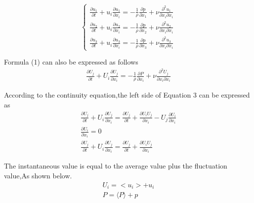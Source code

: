 \begin{equation}
\left\{
\begin{aligned}
\frac{\partial u_{1}}{\partial t}+u_{i}\frac{\partial u_{1}}{\partial x_{i}}=-\frac{1}{\rho}\frac{\partial p}{\partial x_{1}}+\nu\frac{\partial^2 u_{1}}{\partial x_{i} \partial x_{i}}\\
\frac{\partial u_{2}}{\partial t}+u_{i}\frac{\partial u_{2}}{\partial x_{i}}=-\frac{1}{\rho}\frac{\partial p}{\partial x_{2}}+\nu\frac{\partial^2 u_{2}}{\partial x_{i} \partial x_{i}}\\
\frac{\partial u_{3}}{\partial t}+u_{i}\frac{\partial u_{3}}{\partial x_{i}}=-\frac{1}{\rho}\frac{\partial p}{\partial x_{3}}+\nu\frac{\partial^2 u_{3}}{\partial x_{i} \partial x_{i}} 
\end{aligned}
\right.
\end{equation}

Formula (1) can also be expressed as follows
\begin{equation}
\begin{aligned}
\frac{\partial U_{j}}{\partial t}+U_{i}\frac{\partial U_{j}}{\partial x_{i}}=-\frac{1}{\rho}\frac{\partial P}{\partial x_{i}}+\nu\frac{\partial^2 U_{j}}{\partial x_{i}\partial x_{i}}
\end{aligned}
\end{equation}

According to the continuity equation,the left side of Equation 3 can be expressed as
\begin{equation}
\begin{aligned}
\frac{\partial U_{j}}{\partial t}+U_{i}\frac{\partial U_{j}}{\partial x_{i}}=\frac{\partial U_{j}}{\partial t}+\frac{\partial U_{i}U_{j}}{\partial x_{i}}-U_{j}\frac{\partial U_{i}}{\partial x_{i}}\\
\frac{\partial U_{i}}{\partial x_{i}}=0\\
\frac{\partial U_{j}}{\partial t}+U_{i}\frac{\partial U_{j}}{\partial x_{i}}=\frac{\partial U_{j}}{\partial t}+\frac{\partial U_{i}U_{j}}{\partial x_{i}}
\end{aligned}
\end{equation}

The instantaneous value is equal to the average value plus the fluctuation value,As shown below.
\begin{equation}
\begin{aligned}
U_{i}=<u_{i}>+u_{i}\\
P=\langle P \rangle+p
\end{aligned}
\end{equation}


